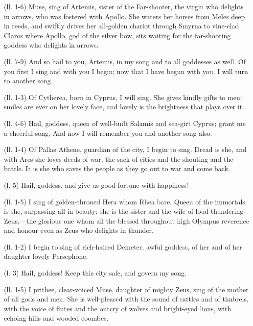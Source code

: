 
(ll. 1-6) Muse, sing of Artemis, sister of the Far-shooter, the virgin who
delights in arrows, who was fostered with Apollo. She waters her horses from
Meles deep in reeds, and swiftly drives her all-golden chariot through Smyrna
to vine-clad Claros where Apollo, god of the silver bow, sits waiting for the
far-shooting goddess who delights in arrows.

(ll. 7-9) And so hail to you, Artemis, in my song and to all goddesses as well.
Of you first I sing and with you I begin; now that I have begun with you, I
will turn to another song.


(ll. 1-3) Of Cytherea, born in Cyprus, I will sing. She gives kindly gifts to
men: smiles are ever on her lovely face, and lovely is the brightness that
plays over it.

(ll. 4-6) Hail, goddess, queen of well-built Salamis and sea-girt Cyprus; grant
me a cheerful song. And now I will remember you and another song also.


(ll. 1-4) Of Pallas Athene, guardian of the city, I begin to sing. Dread is
she, and with Ares she loves deeds of war, the sack of cities and the shouting
and the battle. It is she who saves the people as they go out to war and come
back.

(l. 5) Hail, goddess, and give us good fortune with happiness!


(ll. 1-5) I sing of golden-throned Hera whom Rhea bare. Queen of the immortals
is she, surpassing all in beauty: she is the sister and the wife of
loud-thundering Zeus,—the glorious one whom all the blessed throughout
high Olympus reverence and honour even as Zeus who delights in thunder.


(ll. 1-2) I begin to sing of rich-haired Demeter, awful goddess, of her and of
her daughter lovely Persephone.

(l. 3) Hail, goddess! Keep this city safe, and govern my song.


(ll. 1-5) I prithee, clear-voiced Muse, daughter of mighty Zeus, sing of the
mother of all gods and men. She is well-pleased with the sound of rattles and
of timbrels, with the voice of flutes and the outcry of wolves and bright-eyed
lions, with echoing hills and wooded coombes.

